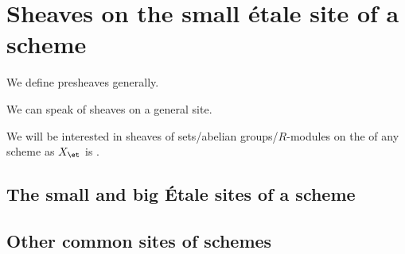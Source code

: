 








\section{Sheaves on the small \'etale site of a scheme}

We define presheaves generally.



We can speak of sheaves on a general site.

We will be interested in sheaves of sets/abelian groups/$R$-modules on the  of any scheme as $X_{\et}$ is .




\subsection{The small and big \'Etale sites of a scheme}





\subsection{Other common sites of schemes}







